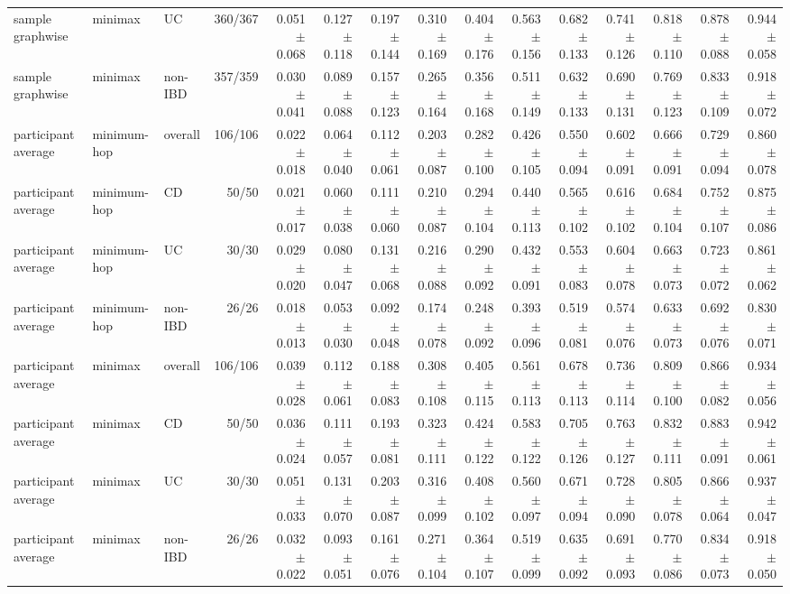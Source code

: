 \begin{table}[ht]
{\begin{tabular}{lllrrrrrrrrrrrr}
sample graphwise & minimax & UC & 360/367 & 0.051 $\pm$ 0.068 & 0.127 $\pm$ 0.118 & 0.197 $\pm$ 0.144 & 0.310 $\pm$ 0.169 & 0.404 $\pm$ 0.176 & 0.563 $\pm$ 0.156 & 0.682 $\pm$ 0.133 & 0.741 $\pm$ 0.126 & 0.818 $\pm$ 0.110 & 0.878 $\pm$ 0.088 & 0.944 $\pm$ 0.058 \\
sample graphwise & minimax & non-IBD & 357/359 & 0.030 $\pm$ 0.041 & 0.089 $\pm$ 0.088 & 0.157 $\pm$ 0.123 & 0.265 $\pm$ 0.164 & 0.356 $\pm$ 0.168 & 0.511 $\pm$ 0.149 & 0.632 $\pm$ 0.133 & 0.690 $\pm$ 0.131 & 0.769 $\pm$ 0.123 & 0.833 $\pm$ 0.109 & 0.918 $\pm$ 0.072 \\
participant average & minimum-hop & overall & 106/106 & 0.022 $\pm$ 0.018 & 0.064 $\pm$ 0.040 & 0.112 $\pm$ 0.061 & 0.203 $\pm$ 0.087 & 0.282 $\pm$ 0.100 & 0.426 $\pm$ 0.105 & 0.550 $\pm$ 0.094 & 0.602 $\pm$ 0.091 & 0.666 $\pm$ 0.091 & 0.729 $\pm$ 0.094 & 0.860 $\pm$ 0.078 \\
participant average & minimum-hop & CD & 50/50 & 0.021 $\pm$ 0.017 & 0.060 $\pm$ 0.038 & 0.111 $\pm$ 0.060 & 0.210 $\pm$ 0.087 & 0.294 $\pm$ 0.104 & 0.440 $\pm$ 0.113 & 0.565 $\pm$ 0.102 & 0.616 $\pm$ 0.102 & 0.684 $\pm$ 0.104 & 0.752 $\pm$ 0.107 & 0.875 $\pm$ 0.086 \\
participant average & minimum-hop & UC & 30/30 & 0.029 $\pm$ 0.020 & 0.080 $\pm$ 0.047 & 0.131 $\pm$ 0.068 & 0.216 $\pm$ 0.088 & 0.290 $\pm$ 0.092 & 0.432 $\pm$ 0.091 & 0.553 $\pm$ 0.083 & 0.604 $\pm$ 0.078 & 0.663 $\pm$ 0.073 & 0.723 $\pm$ 0.072 & 0.861 $\pm$ 0.062 \\
participant average & minimum-hop & non-IBD & 26/26 & 0.018 $\pm$ 0.013 & 0.053 $\pm$ 0.030 & 0.092 $\pm$ 0.048 & 0.174 $\pm$ 0.078 & 0.248 $\pm$ 0.092 & 0.393 $\pm$ 0.096 & 0.519 $\pm$ 0.081 & 0.574 $\pm$ 0.076 & 0.633 $\pm$ 0.073 & 0.692 $\pm$ 0.076 & 0.830 $\pm$ 0.071 \\
participant average & minimax & overall & 106/106 & 0.039 $\pm$ 0.028 & 0.112 $\pm$ 0.061 & 0.188 $\pm$ 0.083 & 0.308 $\pm$ 0.108 & 0.405 $\pm$ 0.115 & 0.561 $\pm$ 0.113 & 0.678 $\pm$ 0.113 & 0.736 $\pm$ 0.114 & 0.809 $\pm$ 0.100 & 0.866 $\pm$ 0.082 & 0.934 $\pm$ 0.056 \\
participant average & minimax & CD & 50/50 & 0.036 $\pm$ 0.024 & 0.111 $\pm$ 0.057 & 0.193 $\pm$ 0.081 & 0.323 $\pm$ 0.111 & 0.424 $\pm$ 0.122 & 0.583 $\pm$ 0.122 & 0.705 $\pm$ 0.126 & 0.763 $\pm$ 0.127 & 0.832 $\pm$ 0.111 & 0.883 $\pm$ 0.091 & 0.942 $\pm$ 0.061 \\
participant average & minimax & UC & 30/30 & 0.051 $\pm$ 0.033 & 0.131 $\pm$ 0.070 & 0.203 $\pm$ 0.087 & 0.316 $\pm$ 0.099 & 0.408 $\pm$ 0.102 & 0.560 $\pm$ 0.097 & 0.671 $\pm$ 0.094 & 0.728 $\pm$ 0.090 & 0.805 $\pm$ 0.078 & 0.866 $\pm$ 0.064 & 0.937 $\pm$ 0.047 \\
participant average & minimax & non-IBD & 26/26 & 0.032 $\pm$ 0.022 & 0.093 $\pm$ 0.051 & 0.161 $\pm$ 0.076 & 0.271 $\pm$ 0.104 & 0.364 $\pm$ 0.107 & 0.519 $\pm$ 0.099 & 0.635 $\pm$ 0.092 & 0.691 $\pm$ 0.093 & 0.770 $\pm$ 0.086 & 0.834 $\pm$ 0.073 & 0.918 $\pm$ 0.050 \\
\bottomrule
\end{tabular}%
}
\end{table}
